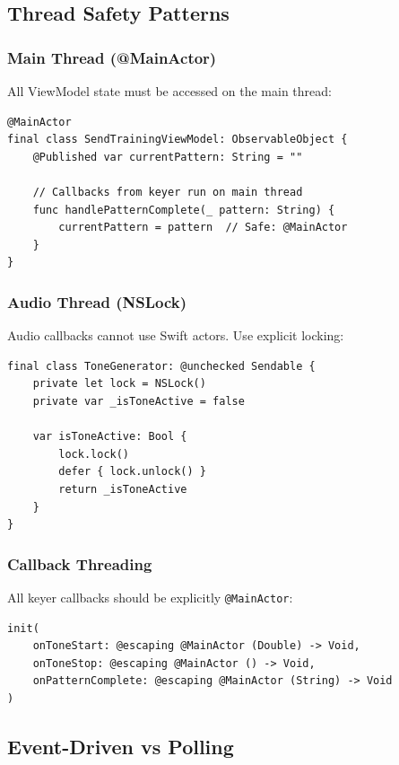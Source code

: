 \documentclass[a4paper,10pt,fleqn]{article}
\begin{document}
\subsection{Thread Safety Patterns}

\subsubsection{Main Thread (@MainActor)}

All ViewModel state must be accessed on the main thread:

\begin{verbatim}
@MainActor
final class SendTrainingViewModel: ObservableObject {
    @Published var currentPattern: String = ""

    // Callbacks from keyer run on main thread
    func handlePatternComplete(_ pattern: String) {
        currentPattern = pattern  // Safe: @MainActor
    }
}
\end{verbatim}

\subsubsection{Audio Thread (NSLock)}

Audio callbacks cannot use Swift actors. Use explicit locking:

\begin{verbatim}
final class ToneGenerator: @unchecked Sendable {
    private let lock = NSLock()
    private var _isToneActive = false

    var isToneActive: Bool {
        lock.lock()
        defer { lock.unlock() }
        return _isToneActive
    }
}
\end{verbatim}

\subsubsection{Callback Threading}

All keyer callbacks should be explicitly \texttt{@MainActor}:

\begin{verbatim}
init(
    onToneStart: @escaping @MainActor (Double) -> Void,
    onToneStop: @escaping @MainActor () -> Void,
    onPatternComplete: @escaping @MainActor (String) -> Void
)
\end{verbatim}

\subsection{Event-Driven vs Polling}
\end{document}
